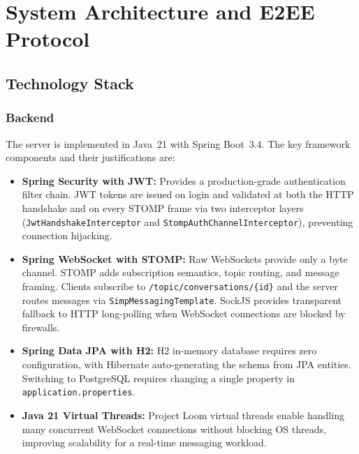 \documentclass[12pt,a4paper]{report}
\begin{document}
\chapter{System Architecture and E2EE Protocol}

\section{Technology Stack}

\subsection{Backend}

The server is implemented in Java~21 with Spring Boot~3.4. The key framework
components and their justifications are:

\begin{itemize}
  \item \textbf{Spring Security with JWT:} Provides a production-grade authentication
  filter chain. JWT tokens are issued on login and validated at both the HTTP handshake
  and on every STOMP frame via two interceptor layers (\texttt{JwtHandshakeInterceptor}
  and \texttt{StompAuthChannelInterceptor}), preventing connection hijacking.

  \item \textbf{Spring WebSocket with STOMP:} Raw WebSockets provide only a byte
  channel. STOMP adds subscription semantics, topic routing, and message framing.
  Clients subscribe to \texttt{/topic/conversations/\{id\}} and the server routes
  messages via \texttt{SimpMessagingTemplate}. SockJS provides transparent fallback to
  HTTP long-polling when WebSocket connections are blocked by firewalls.

  \item \textbf{Spring Data JPA with H2:} H2 in-memory database requires zero
  configuration, with Hibernate auto-generating the schema from JPA entities.
  Switching to PostgreSQL requires changing a single property in
  \texttt{application.properties}.

  \item \textbf{Java 21 Virtual Threads:} Project Loom virtual threads enable handling
  many concurrent WebSocket connections without blocking OS threads, improving
  scalability for a real-time messaging workload.
\end{itemize}
\end{document}
